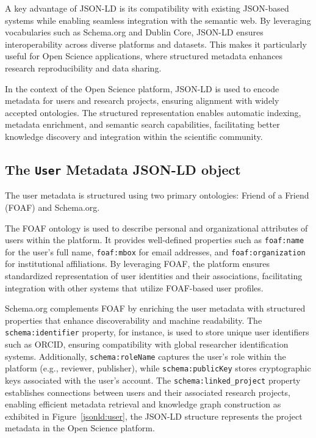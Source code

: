 \documentclass{article}
\begin{document}
A key advantage of JSON-LD is its compatibility with existing JSON-based systems while enabling seamless integration with the semantic web. By leveraging vocabularies such as Schema.org and Dublin Core, JSON-LD ensures interoperability across diverse platforms and datasets. This makes it particularly useful for Open Science applications, where structured metadata enhances research reproducibility and data sharing.

In the context of the Open Science platform, JSON-LD is used to encode metadata for users and research projects, ensuring alignment with widely accepted ontologies. The structured representation enables automatic indexing, metadata enrichment, and semantic search capabilities, facilitating better knowledge discovery and integration within the scientific community.


\subsection{The \texttt{User} Metadata JSON-LD object}

The user metadata is structured using two primary ontologies: Friend of a Friend (FOAF) and Schema.org.

The FOAF ontology is used to describe personal and organizational attributes of users within the platform. It provides well-defined properties such as \texttt{foaf:name} for the user’s full name, \texttt{foaf:mbox} for email addresses, and \texttt{foaf:organization} for institutional affiliations. By leveraging FOAF, the platform ensures standardized representation of user identities and their associations, facilitating integration with other systems that utilize FOAF-based user profiles.

Schema.org complements FOAF by enriching the user metadata with structured properties that enhance discoverability and machine readability. The \texttt{schema:identifier} property, for instance, is used to store unique user identifiers such as ORCID, ensuring compatibility with global researcher identification systems. Additionally, \texttt{schema:roleName} captures the user’s role within the platform (e.g., reviewer, publisher), while \texttt{schema:publicKey} stores cryptographic keys associated with the user’s account. The \texttt{schema:linked\_project} property establishes connections between users and their associated research projects, enabling efficient metadata retrieval and knowledge graph construction as exhibited in Figure~\ref{jsonld:user}, the JSON-LD structure represents the project metadata in the Open Science platform.
\end{document}
